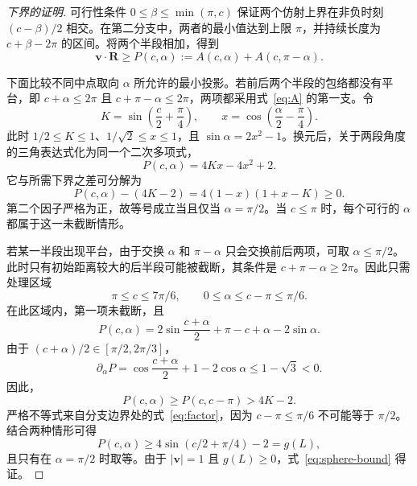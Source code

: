 \documentclass[12pt]{iopjournal}
\theoremstyle{definition}
\newcommand{\Rvec}{\mathbf R}
\newcommand{\vvec}{\mathbf v}
\begin{document}
\begin{proof}[下界的证明]
可行性条件 $0\le\beta\le\min(\pi,c)$ 保证两个仿射上界在非负时刻 $(c-\beta)/2$ 相交。在第二分支中，两者的最小值达到上限 $\pi$，并持续长度为 $c+\beta-2\pi$ 的区间。将两个半段相加，得到
\begin{equation}
 \vvec\cdot\Rvec\ge P(c,\alpha)
 :=A(c,\alpha)+A(c,\pi-\alpha).
 \label{eq:half-sum}
\end{equation}

下面比较不同中点取向 $\alpha$ 所允许的最小投影。若前后两个半段的包络都没有平台，即 $c+\alpha\le2\pi$ 且 $c+\pi-\alpha\le2\pi$，两项都采用式~\eqref{eq:A} 的第一支。令
\begin{equation*}
 K=\sin\left(\frac c2+\frac\pi4\right),\qquad
 x=\cos\left(\frac\alpha2-\frac\pi4\right).
\end{equation*}
此时 $1/2\le K\le1$、$1/\sqrt2\le x\le1$，且 $\sin\alpha=2x^2-1$。换元后，关于两段角度的三角表达式化为同一个二次多项式，
\begin{equation}
 P(c,\alpha)=4Kx-4x^2+2.
\end{equation}
它与所需下界之差可分解为
\begin{equation}
 P(c,\alpha)-(4K-2)=4(1-x)(1+x-K)\ge0.
 \label{eq:factor}
\end{equation}
第二个因子严格为正，故等号成立当且仅当 $\alpha=\pi/2$。当 $c\le\pi$ 时，每个可行的 $\alpha$ 都属于这一未截断情形。

若某一半段出现平台，由于交换 $\alpha$ 和 $\pi-\alpha$ 只会交换前后两项，可取 $\alpha\le\pi/2$。此时只有初始距离较大的后半段可能被截断，其条件是 $c+\pi-\alpha\ge2\pi$。因此只需处理区域
\begin{equation}
 \pi\le c\le7\pi/6,\qquad 0\le\alpha\le c-\pi\le\pi/6.
 \label{eq:cap-region}
\end{equation}
在此区域内，第一项未截断，且
\begin{equation}
 P(c,\alpha)=2\sin\frac{c+\alpha}{2}
              +\pi-c+\alpha-2\sin\alpha.
\end{equation}
由于 $(c+\alpha)/2\in[\pi/2,2\pi/3]$，
\begin{equation}
 \partial_\alpha P
 =\cos\frac{c+\alpha}{2}+1-2\cos\alpha
 \le1-\sqrt3<0.
 \label{eq:cap-monotonicity}
\end{equation}
因此，
\begin{equation*}
 P(c,\alpha)\ge P(c,c-\pi)>4K-2.
\end{equation*}严格不等式来自分支边界处的式~\eqref{eq:factor}，因为 $c-\pi\le\pi/6$ 不可能等于 $\pi/2$。结合两种情形可得
\begin{equation}
 P(c,\alpha)\ge4\sin(c/2+\pi/4)-2=g(L),
 \label{eq:scalar-bound}
\end{equation}
且只有在 $\alpha=\pi/2$ 时取等。由于 $|\vvec|=1$ 且 $g(L)\ge0$，式~\eqref{eq:sphere-bound} 得证。
\end{proof}
\end{document}
